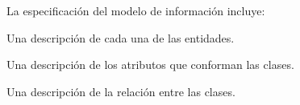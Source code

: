     La especificación del modelo de información incluye:
    \begin{Citemize}
	\item Una descripción de cada una de las entidades.
	\item Una descripción de los atributos que conforman las clases.
	\item Una descripción de la relación entre las clases.
    \end{Citemize}

	

